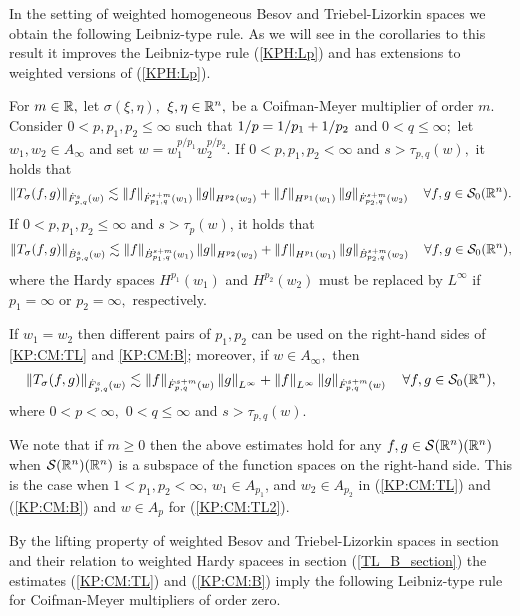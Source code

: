  In the setting of weighted homogeneous Besov and Triebel-Lizorkin spaces we obtain the following Leibniz-type rule. As we will see in the corollaries to this result it improves the Leibniz-type rule (\ref{KPH:Lp}) and has extensions to weighted versions of (\ref{KPH:Lp}).
  
  \begin{theorem}\label{thm:CM:TL:B}  For $m \in \re,$ let $\sigma(\xi,\eta),$ $\xi,\eta\in\rn,$ be a Coifman-Meyer multiplier of order $m.$ Consider  $0 < p, p_1, p_2  \le \infty$  such that $\hcline$ and  $0 < q \leq \infty;$ let  $w_1,w_2\in A_\infty$ and set $w=w_1^{{p}/{p_1}} w_2^{{p}/{p_2}}.$ 
If $0 < p,p_1,p_2 < \infty$ and  $s > \tau_{p,q}(w),$  it holds that
\begin{equation}\label{KP:CM:TL}
\norm{T_\sigma(f,g)}{\tlw{p}{s}{q}{w}} \lesssim \norm{f}{\tlw{p_1}{s+m}{q}{w_1} } \norm{g}{H^{p_2}(w_2)} +  \norm{f}{H^{p_1}(w_1)}   \norm{g}{\tlw{p_2}{s+m}{q}{w_2} } \quad \forall f, g \in \swz.
\end{equation}
If $0< p, p_1,p_2\leq \infty$ and $s > \tau_p(w)$, it holds that
\begin{equation}\label{KP:CM:B}
\norm{T_\sigma(f,g)}{\besw{p}{s}{q}{w}} \lesssim \norm{f}{\besw{p_1}{s+m}{q}{w_1} } \norm{g}{H^{p_2}(w_2)} +  \norm{f}{H^{p_1}(w_1)}   \norm{g}{\besw{p_2}{s+m}{q}{w_2} } \quad \forall f, g \in \swz,
\end{equation}
where the Hardy spaces $H^{p_1}(w_1)$ and $H^{p_2}(w_2)$ must be replaced by $L^\infty$ if $p_1=\infty$ or $p_2=\infty,$ respectively.

If $w_1=w_2$ then different pairs of $p_1, p_2$ can be used on the right-hand sides of \eqref{KP:CM:TL} and \eqref{KP:CM:B}; moreover, if $w\in A_\infty,$ then 
\begin{equation}\label{KP:CM:TL2}
\norm{T_\sigma(f,g)}{\tlw{p}{s}{q}{w}} \lesssim \norm{f}{\tlw{p}{s+m}{q}{w} } \norm{g}{L^\infty} +  \norm{f}{L^\infty}   \norm{g}{\tlw{p}{s+m}{q}{w}} \quad \forall f, g \in \swz,
\end{equation}
where $0<p<\infty,$ $0<q\le\infty$ and $s>\tau_{p,q}(w).$
\end{theorem}

We note that if $m\geq 0$ then the above estimates hold for any $f,g\in\sw(\rn)$ when $\sw(\rn)$ is a subspace of the function spaces on the right-hand side. This is the case when $1<p_1,p_2<\infty$, $w_1\in A_{p_1}$, and $w_2\in A_{p_2}$ in (\ref{KP:CM:TL}) and (\ref{KP:CM:B}) and $w\in A_p$ for (\ref{KP:CM:TL2}). 

By the lifting property of weighted Besov and Triebel-Lizorkin spaces in section and their relation to weighted Hardy spacees in section (\ref{TL_B_section}) the estimates (\ref{KP:CM:TL}) and (\ref{KP:CM:B}) imply the following Leibniz-type rule for Coifman-Meyer multipliers of order zero.

